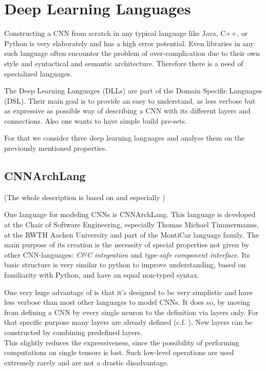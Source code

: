 \chapter{Deep Learning Languages}\label{chapter: DLL}

Constructing a CNN from scratch in any typical language like Java, C++, or Python is very elaborately and has a high error potential. Even libraries in any such language often encounter the problem of over-complication due to their own style and syntactical and semantic architecture. Therefore there is a need of specialized languages.

The Deep Learning Languages (DLLs) are part of the Domain Specific Languages (DSL). Their main goal is to provide an easy to understand, as less verbose but as expressive as possible way of describing a CNN with its different layers and connections. Also one wants to have simple build pre-sets.

For that we consider three deep learning languages and analyse them on the previously mentioned properties.

\section{CNNArchLang}\label{sec: CNNArch}

(The whole description is based on\cite{CNNArch} and especially \cite{tim2018CNNArchLang})

One language for modeling CNNs is CNNArchLang. This language is developed at the Chair of Software Engineering, especially Thomas Michael Timmermanns,  at the RWTH Aachen University and part of the MontiCar language family. The main purpose of its creation is the necessity of special properties not given by other CNN-languages: \textit{C\&C integration} and \textit{type-safe component interface}. Its basic structure is very similar to python to improve understanding, based on familiarity with Python, and have an equal non-typed syntax. 

One very huge advantage of \cnnarch is that it's designed to be very simplistic and have less verbose than most other languages to model CNNs. It does so, by moving from defining a CNN by every single neuron to the definition via layers only. For that specific purpose many layers are already defined (c.f. ). 
New layers can be constructed by combining predefined layers.\\
This slightly reduces the expressiveness, since the possibility of performing computations on single tensors is lost. Such low-level operations are used extremely rarely and are not a drastic disadvantage.

